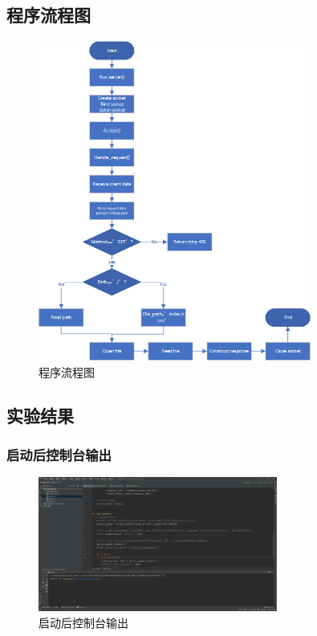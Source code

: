 \documentclass[UTF8,12pt]{article}
\begin{document}
\subsection{程序流程图}
\begin{figure}[htbp]
    \centering
    \includegraphics[width=0.8\textwidth]{img/3.png}
    \caption{程序流程图}
\end{figure}

\newpage

\subsection{实验结果}
\subsubsection{启动后控制台输出}
\begin{figure}[htbp]
    \centering
    \includegraphics[width=0.7\textwidth]{img/4.png}
    \caption{启动后控制台输出}
\end{figure}
\end{document}
